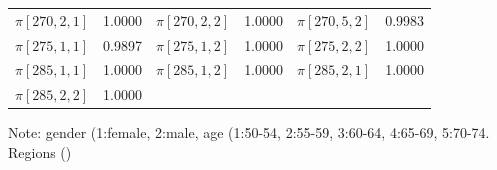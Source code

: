 \documentclass[12pt]{article}
\begin{document}
\begin{table}[h!]
\begin{threeparttable}
\begin{tabular}{cc|cc|cc}
        $\pi[270,2,1]$ & 1.0000 & $\pi[270,2,2]$ & 1.0000 & $\pi[270,5,2]$ & 0.9983 \\ 
        $\pi[275,1,1]$ & 0.9897 & $\pi[275,1,2]$ & 1.0000 & $\pi[275,2,2]$ & 1.0000 \\ 
        $\pi[285,1,1]$ & 1.0000 & $\pi[285,1,2]$ & 1.0000 & $\pi[285,2,1]$ & 1.0000 \\ 
        $\pi[285,2,2]$ & 1.0000 & & & & \\ \hline
        \end{tabular}
        \begin{tablenotes}
          \centering
          \tiny
          \item Note: gender (1:female, 2:male, age (1:50-54, 2:55-59, 3:60-64, 4:65-69, 5:70-74. Regions ()
        \end{tablenotes}
    \end{threeparttable}
\end{table}
\FloatBarrier


    





\end{document}
